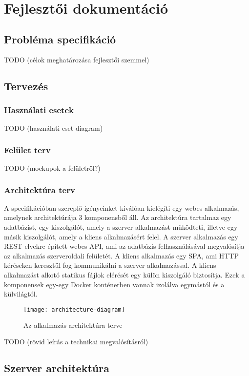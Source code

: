 \documentclass{elteikthesis}
\begin{document}
	\chapter{Fejlesztői dokumentáció}

		\section{Probléma specifikáció}
		TODO (célok meghatározása fejlesztői szemmel)

		\section{Tervezés}

			\subsection{Használati esetek}
			TODO (használati eset diagram)
			
			\subsection{Felület terv}
			TODO (mockupok a felületről?)
			
			\subsection{Architektúra terv}
				A specifikációban szereplő igényeinket kiválóan kielégíti egy webes alkalmazás, amelynek architektúrája 3 komponensből áll. Az architektúra tartalmaz egy adatbázist, egy kiszolgálót, amely a szerver alkalmazást működteti, illetve egy másik kiszolgálót, amely a kliens alkalmazásért felel. A szerver alkalmazás egy REST elvekre épített webes API, ami az adatbázis felhasználásával megvalósítja az alkalmazás szerveroldali felületét. A kliens alkalmazás egy SPA, ami HTTP kéréseken keresztül fog kommunikálni a szerver alkalmazással. A kliens alkalmazást alkotó statikus fájlok elérését egy külön kiszolgáló biztosítja. Ezek a komponensek egy-egy Docker konténerben vannak izolálva egymástól és a külvilágtól.
				
				\begin{figure}[H]
					\centering
					\texttt{[image: architecture-diagram]}
					\caption{Az alkalmazás architektúra terve}
				\end{figure}
			TODO (rövid leírás a technikai megvalósításról)
		
		\section{Szerver architektúra}
\end{document}
